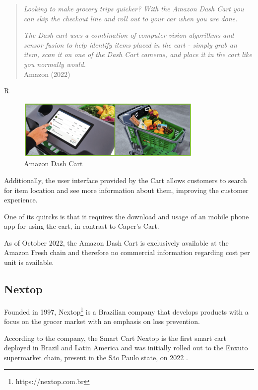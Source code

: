\documentclass[openright]{normas-utf-tex} %
\begin{document}
\begin{quote}
\textit{Looking to make grocery trips quicker? With the Amazon Dash Cart you can skip the checkout line and roll out to your car when you are done.}

\textit{The Dash cart uses a combination of computer vision algorithms and sensor fusion to help identify items placed in the cart - simply grab an item, scan it on one of the Dash Cart cameras, and place it in the cart like you normally would.}
\\
Amazon (2022)
\end{quote}R

\begin{figure}[H]
	\centering
	\includegraphics[width=0.8\textwidth]{./images/dashcart.png}
    \caption[Amazon Dash Cart]{Amazon Dash Cart}
    \label{fig:dashcart}
\end{figure}

Additionally, the user interface provided by the Cart allows customers to search for item location and see more information
about them, improving the customer experience.

One of its quircks is that it requires the download and usage of an mobile phone app for using the cart, in contrast
to Caper's Cart.

As of October 2022, the Amazon Dash Cart is exclusively available at the Amazon
Fresh chain and therefore no commercial information regarding cost per unit is
available.

\subsection{Nextop}

Founded in 1997, Nextop\footnote{https://nextop.com.br} is a Brazilian company
that develops products with a focus on the grocer market with an emphasis on
loss prevention.

According to the company, the Smart Cart Nextop is the first smart cart
deployed in Brazil and Latin America and was initially rolled out to the Enxuto
supermarket chain, present in the São Paulo state, on 2022 \cite{Paraiba2022}.
\end{document}
